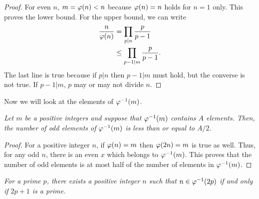 \documentclass{subfile}
\begin{document}
		\begin{proof}
			For even $n$, $m=\varphi (n)<n$ because $\varphi (n)=n$ holds for $n=1$ only. This proves the lower bound. For the upper bound, we can write
				\begin{align*}
					\dfrac{n}{\varphi (n)} & = \prod_{p|n}\dfrac{p}{p-1}\\
									  & \leq \prod_{p-1|m}\dfrac{p}{p-1}.
				\end{align*}
			The last line is true because if $p|n$ then $p-1|m$ must hold, but the converse is not true. If $p-1|m$, $p$ may or may not divide $n$.
		\end{proof}
	
	Now we will look at the elements of $\varphi ^{-1}(m)$.
		\begin{theorem}\slshape
			Let $m$ be a positive integers and suppose that $\varphi ^{-1}(m)$ contains $A$ elements. Then, the number of odd elements of $\varphi ^{-1}(m)$ is less than or equal to $A/2$.
		\end{theorem}
		
		\begin{proof}
			For a positive integer $n$, if $\varphi (n)=m$ then $\varphi (2n)=m$ is true as well. Thus, for any odd $n$, there is an even $x$ which belongs to $\varphi ^{-1}(m)$. This proves that the number of odd elements is at most half of the number of elements in $\varphi ^{-1}(m)$.
		\end{proof}
		
		\begin{theorem}\slshape
			For a prime $p$, there exists a positive integer $n$ such that $n\in\varphi ^{-1}(2p)$ if and only if $2p+1$ is a prime.
		\end{theorem}
		
\end{document}
